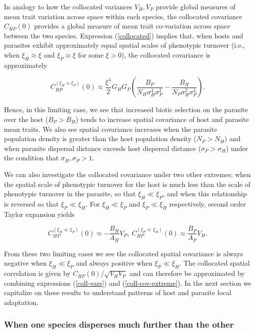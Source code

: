 \documentclass{article}
\begin{document}
In analogy to how the collocated variances \(V_H,V_P\) provide global
measures of mean trait variation across space within each species, the
collocated covariance \(C_{HP}(0)\) provides a global measure of mean
trait co-variation across space between the two species. Expression
(\ref{collocated}) implies that, when hosts and parasites exhibit
approximately equal spatial scales of phenotypic turnover (i.e., when
\(\xi_H\approx\xi\) and \(\xi_P\approx\xi\) for some \(\xi>0\)), the
collocated covariance is approximately

\begin{equation}
  C_{HP}^{(\xi_H\approx\xi_P)}(0)\approx \frac{\xi^4}{2}G_HG_P\left(\frac{B_P}{ N_H\sigma_H^4\sigma_P^2}-\frac{B_H}{ N_P\sigma_H^2\sigma_P^4}\right).
\end{equation}

Hence, in this limiting case, we see that increased biotic selection on
the parasite over the host (\(B_P>B_H\)) tends to increase spatial
covariance of host and parasite mean traits. We also see spatial
covariance increases when the parasite population density is greater
than the host population density (\(N_P>N_H\)) and when parasite
dispersal distance exceeds host dispersal distance
(\(\sigma_P>\sigma_H\)) under the condition that
\(\sigma_H,\sigma_P>1\).

We can also investigate the collocated covariance under two other
extremes; when the spatial scale of phenotypic turnover for the host is
much less than the scale of phenotypic turnover in the parasite, so that
\(\xi_H\ll\xi_P\), and when this relationship is reversed so that
\(\xi_P\ll\xi_H\). For \(\xi_H\ll\xi_P\) and \(\xi_P\ll\xi_H\)
respectively, second order Taylor expansion yields

\begin{equation}\label{coll-cov-extreme}
  C_{HP}^{(\xi_H\ll\xi_P)}(0)\approx-\frac{B_H}{A_H}V_P, \ C_{HP}^{(\xi_P\ll\xi_H)}(0)\approx\frac{B_P}{A_P}V_H.
\end{equation}

From these two limiting cases we see the collocated spatial covariance
is always negative when \(\xi_H\ll\xi_P\) and always positive when
\(\xi_P\ll\xi_H\). The collocated spatial correlation is given by
\(C_{HP}(0)/\sqrt{V_HV_P}\) and can therefore be approximated by
combining expressions (\ref{coll-vars}) and (\ref{coll-cov-extreme}). In
the next section we capitalize on these results to understand patterns
of host and parasite local adaptation.

\hypertarget{when-one-species-disperses-much-further-than-the-other}{%
\subsubsection{When one species disperses much further than the
other}\label{when-one-species-disperses-much-further-than-the-other}}
\end{document}
